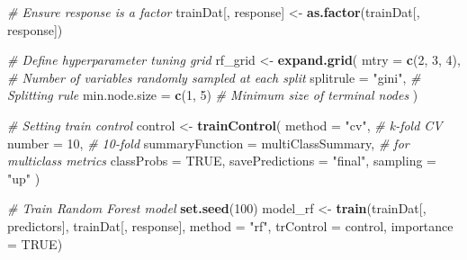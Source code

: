 \documentclass[
]{article}
\newenvironment{Shaded}{\begin{snugshade}}{\end{snugshade}}
\newcommand{\AttributeTok}[1]{\textcolor[rgb]{0.13,0.29,0.53}{#1}}
\newcommand{\CommentTok}[1]{\textcolor[rgb]{0.56,0.35,0.01}{\textit{#1}}}
\newcommand{\ConstantTok}[1]{\textcolor[rgb]{0.56,0.35,0.01}{#1}}
\newcommand{\DecValTok}[1]{\textcolor[rgb]{0.00,0.00,0.81}{#1}}
\newcommand{\FunctionTok}[1]{\textcolor[rgb]{0.13,0.29,0.53}{\textbf{#1}}}
\newcommand{\NormalTok}[1]{#1}
\newcommand{\OtherTok}[1]{\textcolor[rgb]{0.56,0.35,0.01}{#1}}
\newcommand{\SpecialCharTok}[1]{\textcolor[rgb]{0.81,0.36,0.00}{\textbf{#1}}}
\newcommand{\StringTok}[1]{\textcolor[rgb]{0.31,0.60,0.02}{#1}}
\begin{document}
\begin{Shaded}
\begin{Highlighting}[]
\CommentTok{\# Ensure response is a factor}
\NormalTok{trainDat[, response] }\OtherTok{\textless{}{-}} \FunctionTok{as.factor}\NormalTok{(trainDat[, response])}

\CommentTok{\# Define hyperparameter tuning grid }
\NormalTok{rf\_grid }\OtherTok{\textless{}{-}} \FunctionTok{expand.grid}\NormalTok{(}
  \AttributeTok{mtry =} \FunctionTok{c}\NormalTok{(}\DecValTok{2}\NormalTok{, }\DecValTok{3}\NormalTok{, }\DecValTok{4}\NormalTok{),  }\CommentTok{\# Number of variables randomly sampled at each split}
  \AttributeTok{splitrule =} \StringTok{"gini"}\NormalTok{, }\CommentTok{\# Splitting rule}
  \AttributeTok{min.node.size =} \FunctionTok{c}\NormalTok{(}\DecValTok{1}\NormalTok{, }\DecValTok{5}\NormalTok{) }\CommentTok{\# Minimum size of terminal nodes}
\NormalTok{)}

\CommentTok{\# Setting train control}
\NormalTok{control }\OtherTok{\textless{}{-}} \FunctionTok{trainControl}\NormalTok{(}
  \AttributeTok{method =} \StringTok{"cv"}\NormalTok{,         }\CommentTok{\# k{-}fold CV}
  \AttributeTok{number =} \DecValTok{10}\NormalTok{,           }\CommentTok{\# 10{-}fold}
  \AttributeTok{summaryFunction =}\NormalTok{ multiClassSummary,  }\CommentTok{\# for multiclass metrics}
  \AttributeTok{classProbs =} \ConstantTok{TRUE}\NormalTok{,}
  \AttributeTok{savePredictions =} \StringTok{"final"}\NormalTok{,}
  \AttributeTok{sampling =} \StringTok{"up"}
\NormalTok{)}

\CommentTok{\# Train Random Forest model}
\FunctionTok{set.seed}\NormalTok{(}\DecValTok{100}\NormalTok{)}
\NormalTok{model\_rf }\OtherTok{\textless{}{-}} \FunctionTok{train}\NormalTok{(trainDat[, predictors], trainDat[, response], }
                  \AttributeTok{method =} \StringTok{"rf"}\NormalTok{, }
                  \AttributeTok{trControl =}\NormalTok{ control,}
                  \AttributeTok{importance =} \ConstantTok{TRUE}\NormalTok{)}
\end{Highlighting}
\end{Shaded}

\begin{Shaded}
\end{Shaded}
\end{document}
